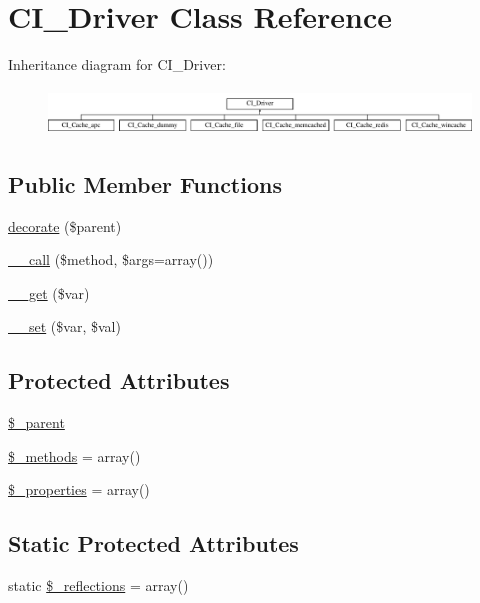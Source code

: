 \hypertarget{class_c_i___driver}{}\section{C\+I\+\_\+\+Driver Class Reference}
\label{class_c_i___driver}
Inheritance diagram for C\+I\+\_\+\+Driver\+:\begin{figure}[H]
\begin{center}
\leavevmode
\includegraphics[height=1.244444cm]{class_c_i___driver}
\end{center}
\end{figure}
\subsection*{Public Member Functions}
\begin{DoxyCompactItemize}
\item 
\hyperlink{class_c_i___driver_acf6a5ad6a84d4c7a27f463cbb618004b}{decorate} (\$parent)
\item 
\hyperlink{class_c_i___driver_a57936fde7f1adea3f3e7dfca474a1786}{\+\_\+\+\_\+call} (\$method, \$args=array())
\item 
\hyperlink{class_c_i___driver_a8fb2d9cdca17b87400e780b9f9720933}{\+\_\+\+\_\+get} (\$var)
\item 
\hyperlink{class_c_i___driver_a921783e9d7c3fb79479375193c9f3d1e}{\+\_\+\+\_\+set} (\$var, \$val)
\end{DoxyCompactItemize}
\subsection*{Protected Attributes}
\begin{DoxyCompactItemize}
\item 
\hyperlink{class_c_i___driver_a8c040f02d9e695416231845d2aaf7f59}{\$\+\_\+parent}
\item 
\hyperlink{class_c_i___driver_a148e2042f169cec802078e58a46ace92}{\$\+\_\+methods} = array()
\item 
\hyperlink{class_c_i___driver_a677f712430f384ffa402fac50940ace4}{\$\+\_\+properties} = array()
\end{DoxyCompactItemize}
\subsection*{Static Protected Attributes}
\begin{DoxyCompactItemize}
\item 
static \hyperlink{class_c_i___driver_a3eae4dfd334261dd94fe0e148501513f}{\$\+\_\+reflections} = array()
\end{DoxyCompactItemize}


